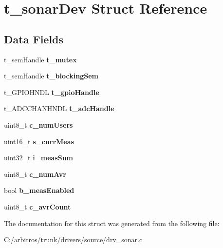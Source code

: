 \hypertarget{structt__sonar_dev}{\section{t\-\_\-sonar\-Dev Struct Reference}
\label{structt__sonar_dev}
}
\subsection*{Data Fields}
\begin{DoxyCompactItemize}
\item 
\hypertarget{structt__sonar_dev_a0f119a919d5e98b1d316a3b11cba4a12}{t\-\_\-sem\-Handle {\bfseries t\-\_\-mutex}}\label{structt__sonar_dev_a0f119a919d5e98b1d316a3b11cba4a12}

\item 
\hypertarget{structt__sonar_dev_abb524707f322769b70146bd8806b50f9}{t\-\_\-sem\-Handle {\bfseries t\-\_\-blocking\-Sem}}\label{structt__sonar_dev_abb524707f322769b70146bd8806b50f9}

\item 
\hypertarget{structt__sonar_dev_a92f86ccbfc7a973936174fc1b331ac7e}{t\-\_\-\-G\-P\-I\-O\-H\-N\-D\-L {\bfseries t\-\_\-gpio\-Handle}}\label{structt__sonar_dev_a92f86ccbfc7a973936174fc1b331ac7e}

\item 
\hypertarget{structt__sonar_dev_a4207c8819b007c1645ac75524e2d92d2}{t\-\_\-\-A\-D\-C\-C\-H\-A\-N\-H\-N\-D\-L {\bfseries t\-\_\-adc\-Handle}}\label{structt__sonar_dev_a4207c8819b007c1645ac75524e2d92d2}

\item 
\hypertarget{structt__sonar_dev_a65907c8d88006e5cdc5e6b18eb4606ba}{uint8\-\_\-t {\bfseries c\-\_\-num\-Users}}\label{structt__sonar_dev_a65907c8d88006e5cdc5e6b18eb4606ba}

\item 
\hypertarget{structt__sonar_dev_a96daa2e9a96ddcc1ae089badd9b2ac7d}{uint16\-\_\-t {\bfseries s\-\_\-curr\-Meas}}\label{structt__sonar_dev_a96daa2e9a96ddcc1ae089badd9b2ac7d}

\item 
\hypertarget{structt__sonar_dev_ac64bfe443505db7d2169b341238bfe5f}{uint32\-\_\-t {\bfseries i\-\_\-meas\-Sum}}\label{structt__sonar_dev_ac64bfe443505db7d2169b341238bfe5f}

\item 
\hypertarget{structt__sonar_dev_aba7b33761259cfe9c01150347b985ad9}{uint8\-\_\-t {\bfseries c\-\_\-num\-Avr}}\label{structt__sonar_dev_aba7b33761259cfe9c01150347b985ad9}

\item 
\hypertarget{structt__sonar_dev_ad7e3e7732d7e19fad5a0855f016b32a4}{bool {\bfseries b\-\_\-meas\-Enabled}}\label{structt__sonar_dev_ad7e3e7732d7e19fad5a0855f016b32a4}

\item 
\hypertarget{structt__sonar_dev_a41f295437a98113f5a383ed3ac876d10}{uint8\-\_\-t {\bfseries c\-\_\-avr\-Count}}\label{structt__sonar_dev_a41f295437a98113f5a383ed3ac876d10}

\end{DoxyCompactItemize}


The documentation for this struct was generated from the following file\-:\begin{DoxyCompactItemize}
\item 
C\-:/arbitros/trunk/drivers/source/drv\-\_\-sonar.\-c\end{DoxyCompactItemize}
